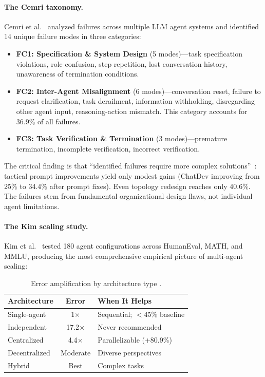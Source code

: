 \documentclass{article}
\begin{document}
\paragraph{The Cemri taxonomy.}
Cemri et al.~\citep{cemri2025fail} analyzed failures across multiple LLM agent
systems and identified 14 unique failure modes in three categories:

\begin{itemize}[nosep]
  \item \textbf{FC1: Specification \& System Design} (5 modes)---task specification
    violations, role confusion, step repetition, lost conversation history, unawareness
    of termination conditions.
  \item \textbf{FC2: Inter-Agent Misalignment} (6 modes)---conversation reset, failure
    to request clarification, task derailment, information withholding, disregarding
    other agent input, reasoning-action mismatch. This category accounts for 36.9\%
    of all failures.
  \item \textbf{FC3: Task Verification \& Termination} (3 modes)---premature
    termination, incomplete verification, incorrect verification.
\end{itemize}

\noindent
The critical finding is that ``identified failures require more complex
solutions''~\citep{cemri2025fail}: tactical prompt improvements yield only modest
gains (ChatDev improving from 25\% to 34.4\% after prompt fixes). Even topology
redesign reaches only 40.6\%. The failures stem from fundamental organizational
design flaws, not individual agent limitations.

\paragraph{The Kim scaling study.}
Kim et al.~\citep{kim2025scaling} tested 180 agent configurations across HumanEval,
MATH, and MMLU, producing the most comprehensive empirical picture of multi-agent
scaling:

\begin{table}[h]
\centering
\caption{Error amplification by architecture type \citep{kim2025scaling}.}
\label{tab:error-amp}
\small
\begin{tabular}{@{} p{2.6cm} c p{2.6cm} @{}}
\toprule
\textbf{Architecture} & \textbf{Error} & \textbf{When It Helps} \\
\midrule
Single-agent & 1$\times$ & Sequential; $<$45\% baseline \\
Independent & 17.2$\times$ & Never recommended \\
Centralized & 4.4$\times$ & Parallelizable (+80.9\%) \\
Decentralized & Moderate & Diverse perspectives \\
Hybrid & Best & Complex tasks \\
\bottomrule
\end{tabular}
\end{table}
\end{document}

